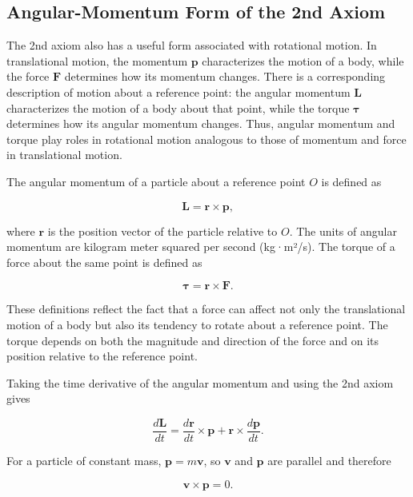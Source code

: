 \documentclass[../main.tex]{subfiles}
\begin{document}
\subsection{Angular-Momentum Form of the 2nd Axiom}

The 2nd axiom also has a useful form associated with rotational motion.
In translational motion, the momentum $\mathbf{p}$ characterizes the
motion of a body, while the force $\mathbf{F}$ determines how its
momentum changes. There is a corresponding description of motion about
a reference point: the angular momentum $\mathbf{L}$ characterizes the
motion of a body about that point, while the torque $\boldsymbol{\tau}$
determines how its angular momentum changes. Thus, angular momentum and
torque play roles in rotational motion analogous to those of momentum
and force in translational motion.

The angular momentum of a particle about a reference point $O$ is
defined as

\begin{equation}
\mathbf{L} = \mathbf{r}\times\mathbf{p},
\end{equation}

where $\mathbf{r}$ is the position vector of the particle relative
to $O$. The units of angular momentum are kilogram meter squared per second (kg·m²/s). The torque of a force about the same point is defined as

\begin{equation}
\boldsymbol{\tau}
= \mathbf{r}\times\mathbf{F}.
\end{equation}

These definitions reflect the fact that a force can affect not only
the translational motion of a body but also its tendency to rotate
about a reference point. The torque depends on both the magnitude and
direction of the force and on its position relative to the reference
point.

Taking the time derivative of the angular momentum and using the
2nd axiom gives

\begin{equation}
\frac{d\mathbf{L}}{dt}
= \frac{d\mathbf{r}}{dt}\times\mathbf{p}
+ \mathbf{r}\times\frac{d\mathbf{p}}{dt}.
\end{equation}

For a particle of constant mass, $\mathbf{p}=m\mathbf{v}$, so
$\mathbf{v}$ and $\mathbf{p}$ are parallel and therefore

\begin{equation}
\mathbf{v}\times\mathbf{p}=0.
\end{equation}
\end{document}
